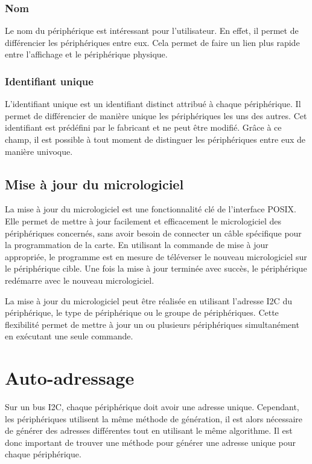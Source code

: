\subsubsection{Nom}

Le nom du périphérique est intéressant pour l'utilisateur. En effet, il permet de différencier les périphériques entre eux. Cela permet de faire un lien plus rapide entre l'affichage et le périphérique physique.

\subsubsection{Identifiant unique}

L'identifiant unique est un identifiant distinct attribué à chaque périphérique.
Il permet de différencier de manière unique les périphériques les uns des autres.
Cet identifiant est prédéfini par le fabricant et ne peut être modifié.
Grâce à ce champ, il est possible à tout moment de distinguer les périphériques entre eux de manière univoque.

\subsection{Mise à jour du micrologiciel}

La mise à jour du micrologiciel est une fonctionnalité clé de l'interface POSIX.
Elle permet de mettre à jour facilement et efficacement le micrologiciel des périphériques concernés, sans avoir besoin de connecter un câble spécifique pour la programmation de la carte.
En utilisant la commande de mise à jour appropriée, le programme est en mesure de téléverser le nouveau micrologiciel sur le périphérique cible.
Une fois la mise à jour terminée avec succès, le périphérique redémarre avec le nouveau micrologiciel.

La mise à jour du micrologiciel peut être réalisée en utilisant l'adresse I2C du périphérique, le type de périphérique ou le groupe de périphériques.
Cette flexibilité permet de mettre à jour un ou plusieurs périphériques simultanément en exécutant une seule commande.

\section{Auto-adressage}

Sur un bus I2C, chaque périphérique doit avoir une adresse unique.
Cependant, les périphériques utilisent la même méthode de génération, il est alors nécessaire de générer des adresses différentes tout en utilisant le même algorithme.
Il est donc important de trouver une méthode pour générer une adresse unique pour chaque périphérique.

